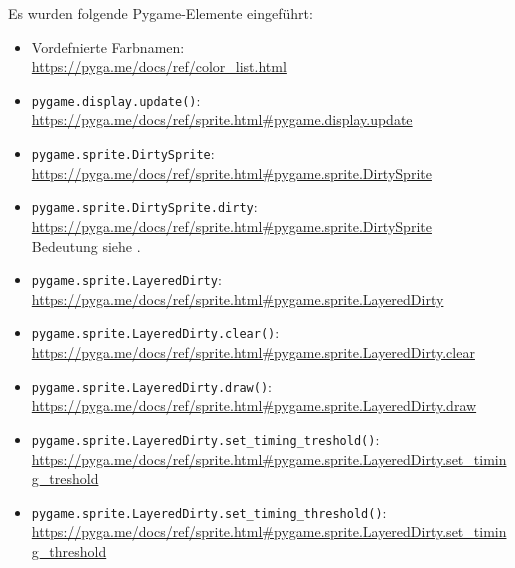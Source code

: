 Es wurden folgende Pygame-Elemente eingeführt:
\begin{itemize}
	\item Vordefnierte Farbnamen:\\ 
	\url{https://pyga.me/docs/ref/color_list.html}

	\item\texttt{pygame.display.update()}:
	\\ \url{https://pyga.me/docs/ref/sprite.html#pygame.display.update}

	\item\texttt{pygame.sprite.DirtySprite}:
	\\ \url{https://pyga.me/docs/ref/sprite.html#pygame.sprite.DirtySprite}

	\item\texttt{pygame.sprite.DirtySprite.dirty}:
	\\ \url{https://pyga.me/docs/ref/sprite.html#pygame.sprite.DirtySprite}\\
	Bedeutung siehe .

	\item \texttt{pygame.sprite.LayeredDirty}:
	\\ \url{https://pyga.me/docs/ref/sprite.html#pygame.sprite.LayeredDirty}
	
	\item \texttt{pygame.sprite.LayeredDirty.clear()}:
	\\ \url{https://pyga.me/docs/ref/sprite.html#pygame.sprite.LayeredDirty.clear}
	
	\item \texttt{pygame.sprite.LayeredDirty.draw()}:
	\\ \url{https://pyga.me/docs/ref/sprite.html#pygame.sprite.LayeredDirty.draw}

	\item \texttt{pygame.sprite.LayeredDirty.set\_timing\_treshold()}:
	\\ \url{https://pyga.me/docs/ref/sprite.html#pygame.sprite.LayeredDirty.set\_timing\_treshold}

	\item \texttt{pygame.sprite.LayeredDirty.set\_timing\_threshold()}:
	\\ \url{https://pyga.me/docs/ref/sprite.html#pygame.sprite.LayeredDirty.set\_timing\_threshold}

\end{itemize}

